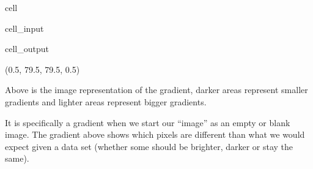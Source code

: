 \documentclass[letterpaper,10pt,english]{jupyterBook}
\begin{document}
\begin{sphinxuseclass}{cell}\begin{sphinxVerbatimInput}

\begin{sphinxuseclass}{cell_input}
\begin{sphinxVerbatim}[commandchars=\\\{\}]
   
   
       
\end{sphinxVerbatim}

\end{sphinxuseclass}\end{sphinxVerbatimInput}
\begin{sphinxVerbatimOutput}

\begin{sphinxuseclass}{cell_output}
\begin{sphinxVerbatim}[commandchars=\\\{\}]
(\PYGZhy{}0.5, 79.5, 79.5, \PYGZhy{}0.5)
\end{sphinxVerbatim}

\noindent{}

\end{sphinxuseclass}\end{sphinxVerbatimOutput}

\end{sphinxuseclass}
\sphinxAtStartPar
Above is the image representation of the gradient, darker areas represent smaller gradients and lighter areas represent bigger gradients.

\sphinxAtStartPar
It is specifically a gradient when we start our “image” as an empty or blank image. The gradient above shows which pixels are different than what we would expect given a data set (whether some should be brighter, darker or stay the same).
\end{document}
